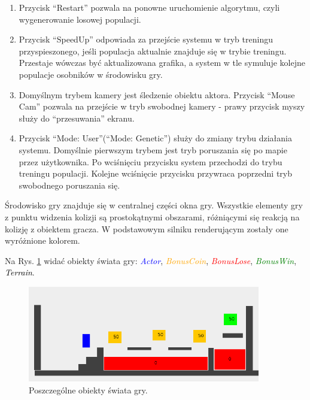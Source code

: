 \begin{par}
\begin{enumerate}
	\item Przycisk ``Restart'' pozwala na ponowne uruchomienie algorytmu, czyli wygenerowanie losowej populacji.
	\item Przycisk ``SpeedUp'' odpowiada za przejście systemu w tryb treningu przyspieszonego, jeśli populacja aktualnie znajduje się w trybie treningu. Przestaje wówczas być aktualizowana grafika, a system w tle symuluje kolejne populacje osobników w środowisku gry.
	\item Domyślnym trybem kamery jest śledzenie obiektu aktora. Przycisk ``Mouse Cam'' pozwala na przejście w tryb swobodnej kamery - prawy przycisk myszy służy do ``przesuwania'' ekranu.
	\item Przycisk ``Mode: User''(``Mode: Genetic'') służy do zmiany trybu działania systemu. Domyślnie pierwszym trybem jest tryb poruszania się po mapie przez użytkownika. Po wciśnięciu przycisku system przechodzi do trybu treningu populacji. Kolejne wciśnięcie przycisku przywraca poprzedni tryb swobodnego poruszania się.
	\end{enumerate}
	\FloatBarrier
\end{par}
\begin{par}
	Środowisko gry znajduje się w centralnej części okna gry.
	Wszystkie elementy gry z punktu widzenia kolizji są prostokątnymi obszarami, różniącymi się reakcją na kolizję z obiektem gracza. W podstawowym silniku renderującym zostały one wyróżnione kolorem.
	
	Na Rys. \ref{fig:objects} widać obiekty świata gry: 
	\textcolor{blue}{\textit{Actor}}, 
	\textcolor{orange}{\textit{BonusCoin}},
	\textcolor{red}{\textit{BonusLose}},
	\textcolor{green}{\textit{BonusWin}},
	\textcolor{black}{\textit{Terrain}}.

	\begin{figure}[!h]
		\centering
		\includegraphics[width=4in]{obrazki/objects.png}
		\caption{Poszczególne obiekty świata gry.}
		\label{fig:objects}
	\end{figure}
\end{par}
